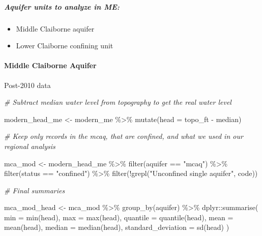 \documentclass[
]{article}
\newenvironment{Shaded}{\begin{snugshade}}{\end{snugshade}}
\newcommand{\AttributeTok}[1]{\textcolor[rgb]{0.77,0.63,0.00}{#1}}
\newcommand{\CommentTok}[1]{\textcolor[rgb]{0.56,0.35,0.01}{\textit{#1}}}
\newcommand{\FunctionTok}[1]{\textcolor[rgb]{0.00,0.00,0.00}{#1}}
\newcommand{\NormalTok}[1]{#1}
\newcommand{\OtherTok}[1]{\textcolor[rgb]{0.56,0.35,0.01}{#1}}
\newcommand{\SpecialCharTok}[1]{\textcolor[rgb]{0.00,0.00,0.00}{#1}}
\newcommand{\StringTok}[1]{\textcolor[rgb]{0.31,0.60,0.02}{#1}}
\providecommand{\tightlist}{%
  \setlength{\itemsep}{0pt}\setlength{\parskip}{0pt}}
\begin{document}
\hypertarget{aquifer-units-to-analyze-in-me}{%
\subparagraph{Aquifer units to analyze in
ME:}\label{aquifer-units-to-analyze-in-me}}

\begin{itemize}
\tightlist
\item
  Middle Claiborne aquifer
\item
  Lower Claiborne confining unit
\end{itemize}

\hypertarget{middle-claiborne-aquifer}{%
\paragraph{Middle Claiborne Aquifer}\label{middle-claiborne-aquifer}}

Post-2010 data

\begin{Shaded}
\begin{Highlighting}[]
\CommentTok{\# Subtract median water level from topography to get the real water level }

\NormalTok{modern\_head\_me }\OtherTok{\textless{}{-}}\NormalTok{ modern\_me }\SpecialCharTok{\%\textgreater{}\%} 
  \FunctionTok{mutate}\NormalTok{(}\AttributeTok{head =}\NormalTok{ topo\_ft }\SpecialCharTok{{-}}\NormalTok{ median)}

\CommentTok{\# Keep only records in the mcaq, that are confined, and what we used in our regional analysis }

\NormalTok{mca\_mod }\OtherTok{\textless{}{-}}\NormalTok{ modern\_head\_me }\SpecialCharTok{\%\textgreater{}\%} 
  \FunctionTok{filter}\NormalTok{(aquifer }\SpecialCharTok{==} \StringTok{"mcaq"}\NormalTok{) }\SpecialCharTok{\%\textgreater{}\%} 
  \FunctionTok{filter}\NormalTok{(status }\SpecialCharTok{==} \StringTok{"confined"}\NormalTok{) }\SpecialCharTok{\%\textgreater{}\%} 
  \FunctionTok{filter}\NormalTok{(}\SpecialCharTok{!}\FunctionTok{grepl}\NormalTok{(}\StringTok{"Unconfined single aquifer"}\NormalTok{, code))}

\CommentTok{\# Final summaries }

\NormalTok{mca\_mod\_head }\OtherTok{\textless{}{-}}\NormalTok{ mca\_mod }\SpecialCharTok{\%\textgreater{}\%}  
  \FunctionTok{group\_by}\NormalTok{(aquifer) }\SpecialCharTok{\%\textgreater{}\%} 
\NormalTok{  dplyr}\SpecialCharTok{::}\FunctionTok{summarise}\NormalTok{(}
    \AttributeTok{min =} \FunctionTok{min}\NormalTok{(head), }
    \AttributeTok{max =} \FunctionTok{max}\NormalTok{(head), }
    \AttributeTok{quantile =} \FunctionTok{quantile}\NormalTok{(head),}
    \AttributeTok{mean =} \FunctionTok{mean}\NormalTok{(head), }
    \AttributeTok{median =} \FunctionTok{median}\NormalTok{(head),}
    \AttributeTok{standard\_deviation =} \FunctionTok{sd}\NormalTok{(head)}
\NormalTok{    )}
\end{Highlighting}
\end{Shaded}
\end{document}
